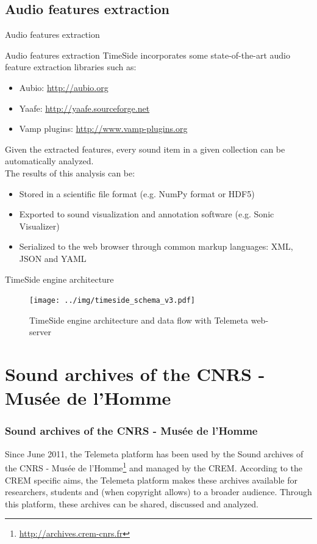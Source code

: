 \documentclass[final, hyperref, table]{beamer}
\begin{document}
\subsection{Audio features extraction}
\begin{frame}{Audio features extraction}
\begin{block}{Audio features extraction}
TimeSide incorporates some state-of-the-art audio feature extraction libraries such as:
\vspace{-0.1cm}
\begin{itemize}
\item Aubio:
    \colorbox{yellow!30}{ \scriptsize \url{http://aubio.org}}
\vspace{-0.1cm}
\item Yaafe:
    \colorbox{yellow!30}{\scriptsize \url{http://yaafe.sourceforge.net}}
\vspace{-0.1cm}
\item Vamp plugins:  
    \colorbox{yellow!30}{\scriptsize \url{http://www.vamp-plugins.org}}
\end{itemize}

Given the extracted features, every sound item in a given
  collection can be automatically analyzed.\\
The results of this
  analysis can be:
  \begin{itemize}\scriptsize
  \item Stored in a scientific file format (e.g. NumPy format or
    HDF5)
  \item Exported to sound visualization and annotation software
    (e.g. Sonic Visualizer)
  \item Serialized to the web browser through common markup languages:
    XML, JSON and YAML
  \end{itemize}
\end{block}

\end{frame}
\begin{frame}{TimeSide engine architecture}
  \begin{figure}[htbp]
  \centering
  \texttt{[image: ../img/timeside\_schema\_v3.pdf]}
  \caption{TimeSide engine architecture and data flow with Telemeta web-server}\label{fig:TimeSide_Archi}
\end{figure}
\end{frame}
  
   
\section{Sound archives of the CNRS - Musée de l'Homme}\label{sec:archives-CREM}
   \begin{frame}\frametitle{Sound archives of the CNRS - Musée de l'Homme}
  Since June 2011, the Telemeta platform has been used by the  Sound archives of the CNRS - Musée de l'Homme\footnote{\url{http://archives.crem-cnrs.fr}} and managed by the CREM. According to the CREM specific aims, the Telemeta platform makes these archives available for researchers, students and (when copyright allows) to a broader audience. Through this platform, these archives can be shared, discussed and analyzed.

\end{frame}
\end{document}
